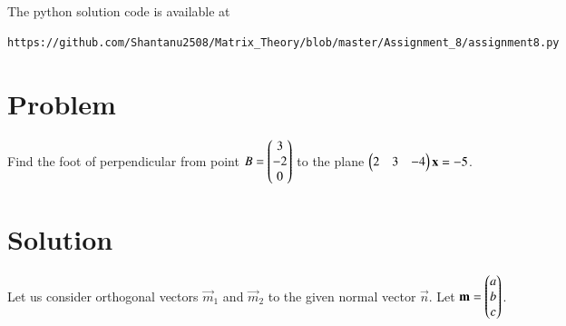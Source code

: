 \documentclass[journal,12pt,twocolumn]{IEEEtran}
\begin{document}
The python solution code is available at
\begin{lstlisting}
https://github.com/Shantanu2508/Matrix_Theory/blob/master/Assignment_8/assignment8.py
\end{lstlisting}

\section{Problem}
Find the foot of perpendicular from point \mbox{$B=\begin{pmatrix}3\\ -2\\ 0\end{pmatrix}$} to the 
plane $\begin{pmatrix}2 & 3 & -4\end{pmatrix}\mathbf{x} = -5$.

\section{Solution}
Let us consider orthogonal vectors $\vec{m}_1$ and $\vec{m}_2$ to the given
normal vector $\vec{n}$. Let $\mathbf{m} = \begin{pmatrix}a\\ b\\ c\end{pmatrix}$.
\end{document}
